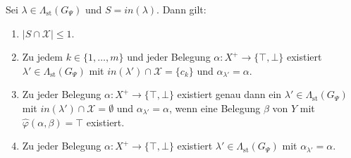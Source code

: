 \begin{Lemma}
    \label{lem:sym-teile}
    Sei \(\lambda\in\Lambda_{\mathrm{st}}(G_\Psi)\) und
    \(S=\mathit{in}(\lambda)\). Dann gilt:
    \begin{enumerate}
        \item \(|S\cap\mathcal{X}|\leq 1\).
        \item Zu jedem \(k\in\{1,\dots,m\}\) und jeder Belegung
        \(\alpha:X^{+}\to\{\top,\bot\}\) existiert
        \(\lambda'\in\Lambda_{\mathrm{st}}(G_\Psi)\) mit
        \(\mathit{in}(\lambda')\cap\mathcal{X}=\{c_k\}\) und
        \(\alpha_{\lambda'}=\alpha\).
        \item Zu jeder Belegung \(\alpha:X^{+}\to\{\top,\bot\}\) existiert
        genau dann ein \(\lambda'\in\Lambda_{\mathrm{st}}(G_\Psi)\) mit
        \(\mathit{in}(\lambda')\cap\mathcal{X}=\emptyset\) und
        \(\alpha_{\lambda'}=\alpha\), wenn eine Belegung \(\beta\) von \(Y\)
        mit \(\widehat{\varphi}(\alpha,\beta)=\top\) existiert.
        \item Zu jeder Belegung \(\alpha:X^{+}\to\{\top,\bot\}\) existiert
        \(\lambda'\in\Lambda_{\mathrm{st}}(G_\Psi)\) mit
        \(\alpha_{\lambda'}=\alpha\).
    \end{enumerate}
\end{Lemma}

